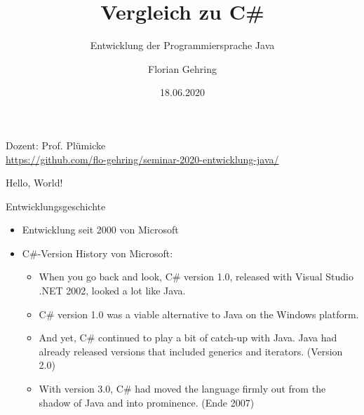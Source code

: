 \documentclass[11pt]{beamer}
\author{Florian Gehring}
\title{Vergleich zu C\#}
\subtitle{Entwicklung der Programmiersprache Java}
\date{18.06.2020}
\begin{document}

\begin{frame}
	\titlepage
	\begin{center}
		Dozent: Prof. Plümicke\medskip \\
		\tiny{\url{https://github.com/flo-gehring/seminar-2020-entwicklung-java/} }

	\end{center}
\end{frame}


\begin{frame}{Hello, World!}
\end{frame}


\begin{frame}{Entwicklungsgeschichte}
	\begin{itemize}
		\item Entwicklung seit 2000 von Microsoft
		\item C\#-Version History von Microsoft:\cite{csharp_history}
		\begin{itemize}
					\item \glqq When you go back and look, C\# version 1.0, released with Visual Studio .NET 2002, looked a lot like Java.\grqq{}
		 \item \glqq C\# version 1.0 was a viable alternative to Java on the Windows platform.\grqq{}
		 \item \glqq And yet, C\# continued to play a bit of catch-up with Java. Java had already released versions that included generics and iterators.\grqq{} (Version 2.0)
		 \item \glqq With version 3.0, C\# had moved the language firmly out from the shadow of Java and into prominence.\grqq{} (Ende 2007)
		\end{itemize}
	\end{itemize}
\end{frame}
\end{document}
